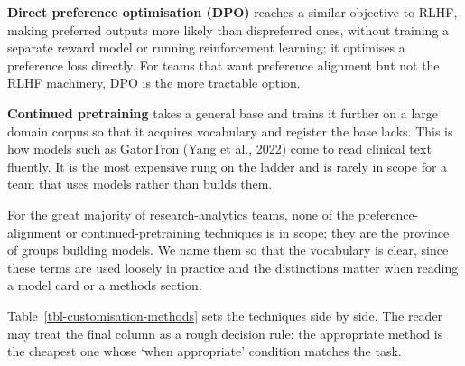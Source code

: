 \documentclass[
  letterpaper,
  11pt]{scrbook}
\newcounter{none} %
\begin{document}
\textbf{Direct preference optimisation (DPO)} reaches a similar
objective to RLHF, making preferred outputs more likely than
dispreferred ones, without training a separate reward model or running
reinforcement learning; it optimises a preference loss directly. For
teams that want preference alignment but not the RLHF machinery, DPO is
the more tractable option.

\textbf{Continued pretraining} takes a general base and trains it
further on a large domain corpus so that it acquires vocabulary and
register the base lacks. This is how models such as GatorTron ({Yang et
al.}, 2022) come to read clinical text fluently. It is the most
expensive rung on the ladder and is rarely in scope for a team that uses
models rather than builds them.

For the great majority of research-analytics teams, none of the
preference-alignment or continued-pretraining techniques is in scope;
they are the province of groups building models. We name them so that
the vocabulary is clear, since these terms are used loosely in practice
and the distinctions matter when reading a model card or a methods
section.

Table~\ref{tbl-customisation-methods} sets the techniques side by side.
The reader may treat the final column as a rough decision rule: the
appropriate method is the cheapest one whose `when appropriate'
condition matches the task.
\end{document}
